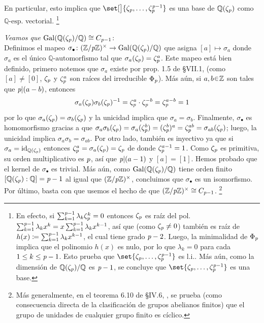 \begin{sol}
\begin{enumerate}[label=\alph*)]
En particular, esto implica que $\set[\big]{\zeta_{\p},\dots,\zeta_{\p}^{{\p}-1}}$ es una base de $\mathbb{Q}(\zeta_{\operatorname{\textit{p}}})$ como $\mathbb{Q}\text{-esp.}$ vectorial.%
\footnote{
    En efecto, si $\sum^{{\operatorname{\textit{p}}}-1}_{k=1} \lambda_k \zeta^k_{\operatorname{\textit{p}}}=0$ entonces $\zeta_{\operatorname{\textit{p}}}$ es raíz del pol. $\sum^{{\operatorname{\textit{p}}}-1}_{k=1} \lambda_kx^k = x\sum^{{\operatorname{\textit{p}}}-1}_{k=1} \lambda_kx^{k-1}$, así que (como $\zeta_{\operatorname{\textit{p}}}\neq 0$) también es raíz de $h(x) \coloneq \sum^{{\operatorname{\textit{p}}}-1}_{k=1} \lambda_kx^{k-1}$, el cual tiene grado ${\operatorname{\textit{p}}}-2$. Luego, la minimalidad de $\Phi_{\operatorname{\textit{p}}}$ implica que el polinomio $h(x)$ es nulo, por lo que $\lambda_k=0$ para cada $1 \leq k \leq {\operatorname{\textit{p}}}-1$. Esto prueba que $\set{\zeta_{\p},\dots,\zeta_{\p}^{{\p}-1}}$ es l.i.. Más aún, como la dimensión de $\mathbb{Q}(\zeta_{\operatorname{\textit{p}}})/\mathbb{Q}$ es ${\operatorname{\textit{p}}}-1$, se concluye que $\set{\zeta_{\p},\dots,\zeta_{\p}^{{\p}-1}}$ es una base.
}
\par\vspace{1em}

\emph{Veamos que $\operatorname{Gal}(\mathbb{Q}(\zeta_{\operatorname{\textit{p}}})/\mathbb{Q}) \cong C_{{\operatorname{\textit{p}}}-1}$}:\\
Definimos el mapeo $\sigma_{\bullet} \colon (\mathbb{Z}/{\operatorname{\textit{p}}}\mathbb{Z})^{\times} \to \operatorname{Gal}(\mathbb{Q}(\zeta_{\operatorname{\textit{p}}})/\mathbb{Q})$ que asigna $[a] \mapsto \sigma_a$ donde $\sigma_a$ es el único $\mathbb{Q}\text{-automorfismo}$ tal que $\sigma_a(\zeta_{\operatorname{\textit{p}}}) = \zeta^a_{\operatorname{\textit{p}}}$. Este mapeo está bien definido, primero notemos que $\sigma_a$ existe por prop. 1.5 de \S VII.1, \cite{aluffi} (como $[a] \neq [0]$, $\zeta_{\operatorname{\textit{p}}}$ y $\zeta^a_{\operatorname{\textit{p}}}$ son raíces del irreducible $\Phi_{\operatorname{\textit{p}}}$). Más aún, si $a,b\en\mathbb{Z}$ son tales que ${\operatorname{\textit{p}}}|(a-b)$, entonces 
\[
\sigma_a(\zeta_{\operatorname{\textit{p}}})\sigma_b(\zeta_{\operatorname{\textit{p}}})^{-1} = \zeta^{a}_{\operatorname{\textit{p}}} \cdot \zeta^{-b}_{\operatorname{\textit{p}}} = \zeta^{a-b}_{\operatorname{\textit{p}}} = 1
\]
por lo que $\sigma_a(\zeta_{\operatorname{\textit{p}}}) = \sigma_b(\zeta_{\operatorname{\textit{p}}})$ y la unicidad implica que $\sigma_a = \sigma_b$. Finalmente, $\sigma_{\bullet}$ es homomorfismo gracias a que $\sigma_a\sigma_b(\zeta_{\operatorname{\textit{p}}}) = \sigma_a(\zeta^b_{\operatorname{\textit{p}}}) = (\zeta^b_{\operatorname{\textit{p}}})^a = \zeta^{ab}_{\operatorname{\textit{p}}} = \sigma_{ab}(\zeta_{\operatorname{\textit{p}}})$; luego, la unicidad implica $\sigma_a\sigma_b = \sigma_{ab}$. Por otro lado, también es inyectivo ya que si $\sigma_{a} = \operatorname{id}_{\mathbb{Q}(\zeta_{\operatorname{\textit{p}}})}$ entonces $\zeta^a_{\operatorname{\textit{p}}}=\sigma_a(\zeta_{\operatorname{\textit{p}}}) = \zeta_{\operatorname{\textit{p}}}$ de donde $\zeta^{a-1}_{\operatorname{\textit{p}}} = 1$. Como $\zeta_{\operatorname{\textit{p}}}$ es primitiva, su orden multiplicativo es ${\operatorname{\textit{p}}}$, así que ${\operatorname{\textit{p}}}|(a-1)$ y $[a] = [1]$. Hemos probado que el kernel de $\sigma_{\bullet}$ es trivial. Más aún, como $\operatorname{Gal}(\mathbb{Q}(\zeta_{\operatorname{\textit{p}}})/\mathbb{Q})$ tiene orden finito $[\mathbb{Q}(\zeta_{\operatorname{\textit{p}}}):\mathbb{Q}] = {\operatorname{\textit{p}}}-1$ al igual que $(\mathbb{Z}/{\operatorname{\textit{p}}}\mathbb{Z})^{\times}$, concluimos que $\sigma_{\bullet}$ es un isomorfismo. Por último, basta con que usemos el hecho de que $(\mathbb{Z}/{\operatorname{\textit{p}}}\mathbb{Z})^{\times} \cong C_{{\operatorname{\textit{p}}}-1}$.%
\footnote{
    Más generalmente, en el teorema 6.10 de \S IV.6, \cite{aluffi}, se prueba (como consecuencia directa de la clasificación de grupos abelianos finitos) que el grupo de unidades de cualquier grupo finito es cíclico.
}\vspace{1em}


\end{enumerate}
\end{sol}
